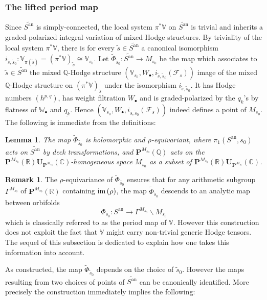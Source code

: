 \documentclass[10pt]{article}
\numberwithin{equation}{subsection}
\theoremstyle{plain}
\newtheorem{lemma}[theorem]{Lemma}
\theoremstyle{definition}
\newtheorem{remark}[theorem]{Remark}
\theoremstyle{remark}
\newcommand{\Q}{\mathbb Q}
\newcommand{\C}{\mathbb C}
\newcommand{\R}{\mathbb R}
\newcommand{\V}{\mathbb V}
\newcommand{\W}{\mathbb W}
\newcommand{\pp}{\mathbf P}
\newcommand{\uu}{\mathbf U}
\newcommand{\bul}{\bullet}
\newcommand{\im}{\mathrm{im} \hspace{0.05cm}}
\newcommand{\an}{\mathrm{an}}
\newcommand{\quo}{\backslash}
\begin{document}
\subsubsection*{The lifted period map}
Since $\widetilde{S^\an}$ is simply-connected, the local system $\pi^\ast \V$ on $\widetilde{S^\an}$ is trivial and inherits a graded-polarized integral variation of mixed Hodge structures. By triviality of the local system $\pi^\ast \V$, there is for every $\tilde{s} \in \widetilde{S^\an}$ a canonical isomorphism $i_{\tilde{s},\tilde{s}_0} : \V_{\pi(\tilde{s})} = (\pi^\ast \V)_{\tilde{s}} \cong \V_{s_0}$. Let $\tilde{\Phi}_{\tilde{s}_0} : \widetilde{S^\an} \rightarrow M_{s_0}$ be the map which associates to $\tilde{s} \in \widetilde{S^\an}$ the mixed $\Q$-Hodge structure $(\V_{s_0}, W_\bul, i_{\tilde{s},\tilde{s}_0}(\mathcal{F}_{s}))$ image of the mixed $\Q$-Hodge structure on $(\pi^\ast \V)_{\tilde{s}}$ under the isomorphism $i_{\tilde{s}, \tilde{s}_0}$. It has Hodge numbers $(h^{p,q})$, has weight filtration $W_\bul$ and is graded-polarized by the $q_k$'s by flatness of $\W_\bul$ and $\underline{q_k}$. Hence $(\V_{s_0}, W_\bul, i_{\tilde{s},\tilde{s}_0}(\mathcal{F}_{s}))$ indeed defines a point of $M_{s_0}$. The following is immediate from the definitions:
\begin{lemma}\label{holper}
The map $\tilde{\Phi}_{\tilde{s_0}}$ is holomorphic and $\rho$-equivariant, where $\pi_1(S^\an,s_0)$ acts on $\widetilde{S^\an}$ by deck transformations, and $\pp^{M_{s_0}}(\Q)$ acts on the $\pp^{M_{s_0}}(\R)\uu_{\pp^{M_{s_0}}}(\C)$-homogeneous space $M_{s_0}$ as a subset of $\pp^{M_{s_0}}(\R)\uu_{\pp^{M_{s_0}}}(\C)$.
\end{lemma}
\begin{remark}
The $\rho$-equivariance of $\tilde{\Phi}_{\tilde{s_0}}$ ensures that for any arithmetic subgroup $\Gamma^{M_{s_0}}$ of $\pp^{M_{s_0}}(\R)$ containing $\im(\rho)$, the map $\tilde{\Phi}_{\tilde{s}_0}$ descends to an analytic map between orbifolds
\[
\Phi_{s_0} : S^\an \rightarrow \Gamma^{M_{s_0}} \quo M_{s_0}
\]
which is classically referred to as the period map of $\V$. However this construction does not exploit the fact that $\V$ might carry non-trivial generic Hodge tensors. The sequel of this subsection is dedicated to explain how one takes this information into account.
\end{remark}
As constructed, the map $\tilde{\Phi}_{\tilde{s}_0}$ depends on the choice of $\tilde{s}_0$. However the maps resulting from two choices of points of $\widetilde{S^\an}$ can be canonically identified. More precisely the construction immediately implies the following:
\end{document}
